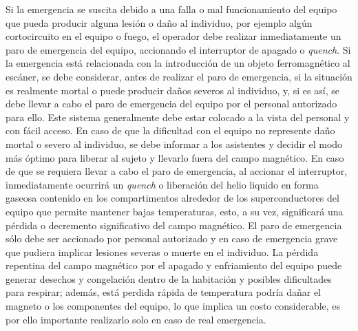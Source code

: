 Si la emergencia se suscita debido a una falla o mal funcionamiento del equipo que pueda producir alguna lesión o daño al individuo, por ejemplo algún cortocircuito en el equipo o fuego, el operador debe realizar inmediatamente un paro de emergencia del equipo, accionando el interruptor de apagado o \emph{quench}. Si la emergencia está relacionada con la introducción de un objeto ferromagnético al escáner, se debe considerar, antes de realizar el paro de emergencia, si la situación es realmente mortal o puede producir daños severos al individuo, y, si es así, se debe llevar a cabo el paro de emergencia del equipo por el personal autorizado para ello. Este sistema generalmente debe estar colocado a la vista del personal y con fácil acceso. En caso de que la dificultad con el equipo no represente daño mortal o severo al individuo, se debe informar a los asistentes y decidir el modo más óptimo para liberar al sujeto y llevarlo fuera del campo magnético. En caso de que se requiera llevar a cabo el paro de emergencia, al accionar el interruptor, inmediatamente ocurrirá un \emph{quench} o liberación del helio liquido en forma gaseosa contenido en los compartimentos alrededor de los superconductores del equipo que permite mantener bajas temperaturas, esto, a su vez, significará una pérdida o decremento significativo del campo magnético. El paro de emergencia sólo debe ser accionado por personal autorizado y en caso de emergencia grave que pudiera implicar lesiones severas o muerte en el individuo. La pérdida repentina del campo magnético por el apagado y enfriamiento del equipo puede generar desechos y congelación dentro de la habitación y posibles dificultades para respirar; además, está perdida rápida de temperatura podría dañar el magneto o los componentes del equipo, lo que implica un costo considerable, es por ello importante realizarlo solo en caso de real emergencia. 


